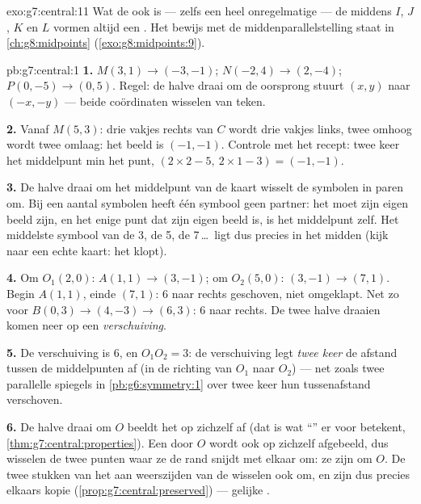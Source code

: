 \begin{solution}{exo:g7:central:11}
Wat de  ook is --- zelfs een heel onregelmatige --- de middens $I$, $J$, $K$
en $L$ vormen altijd een \emph{}. Het bewijs met de
middenparallelstelling staat in \cref{ch:g8:midpoints}
(\cref{exo:g8:midpoints:9}).
\end{solution}

\begin{solution}{pb:g7:central:1}
\textbf{1.} $M(3, 1) \to (-3, -1)$; $N(-2, 4) \to (2, -4)$;
$P(0, -5) \to (0, 5)$. Regel: de halve draai om de oorsprong stuurt $(x, y)$ naar
$(-x, -y)$ --- beide coördinaten wisselen van teken.

\textbf{2.} Vanaf $M(5, 3)$: drie vakjes rechts van $C$ wordt drie vakjes links, twee
omhoog wordt twee omlaag: het beeld is $(-1, -1)$. Controle met het recept: twee keer
het middelpunt min het punt, $(2 \times 2 - 5,\ 2 \times 1 - 3) = (-1, -1)$.

\textbf{3.} De halve draai om het middelpunt van de kaart wisselt de symbolen in
paren om. Bij een  aantal symbolen heeft één symbool geen partner: het moet zijn
eigen beeld zijn, en het enige punt dat zijn eigen beeld is, is het middelpunt zelf.
Het middelste symbool van de 3, de 5, de 7\,\dots\ ligt dus precies in het midden
(kijk naar een echte kaart: het klopt).

\textbf{4.} Om $O_1(2,0)$: $A(1,1) \to (3,-1)$; om $O_2(5,0)$:
$(3,-1) \to (7,1)$. Begin $A(1,1)$, einde $(7,1)$: $6$ naar rechts geschoven, niet
omgeklapt. Net zo voor $B(0,3) \to (4,-3) \to (6,3)$: $6$ naar rechts. De twee halve
draaien komen neer op een \emph{verschuiving}.

\textbf{5.} De verschuiving is $6$, en $O_1 O_2 = 3$: de verschuiving legt
\emph{twee keer} de afstand tussen de middelpunten af (in de richting van $O_1$ naar
$O_2$) --- net zoals twee parallelle spiegels in \cref{pb:g6:symmetry:1} over twee
keer hun tussenafstand verschoven.

\textbf{6.} De halve draai om $O$ beeldt het  op zichzelf af (dat is
wat ``'' er voor betekent,
\cref{thm:g7:central:properties}). Een  door $O$ wordt ook op zichzelf
afgebeeld, dus wisselen de twee punten waar ze de rand snijdt met elkaar om: ze zijn
 om $O$. De twee stukken van het  aan weerszijden van de
 wisselen ook om, en zijn dus precies elkaars kopie
(\cref{prop:g7:central:preserved}) --- gelijke .


\end{solution}
